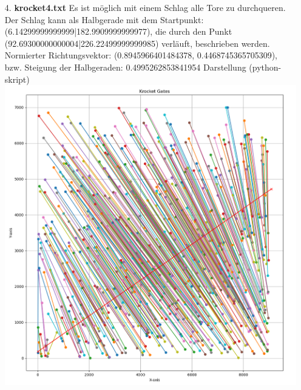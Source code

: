 \documentclass[a4paper,10pt,ngerman]{scrartcl}
\begin{document}
\begin{itemize}
  \item [4.] \textbf{krocket4.txt}
  \newline
  Es ist möglich mit einem Schlag alle Tore zu durchqueren.
  Der Schlag kann als Halbgerade mit dem Startpunkt: (6.14299999999999|182.9909999999977), die durch den 
  \newline Punkt (92.69300000000004|226.22499999999985) verläuft, beschrieben werden.
  \newline
  Normierter Richtungsvektor: (0.8945966401484378, 0.4468745365705309), bzw. Steigung der Halbgeraden: 0.4995262853841954
  \newline
  \newline
  Darstellung (python-skript)
  \newline
  \includegraphics[scale=0.40]{krocket4.png}
  \newpage


\end{itemize}
\end{document}
